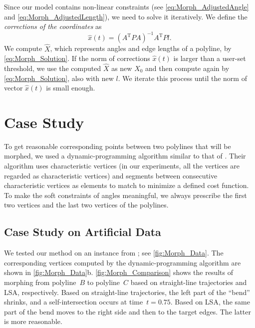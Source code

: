Since our model contains non-linear constraints
(see \eqs\ref{eq:Morph_AdjustedAngle}
and \ref{eq:Morph_AdjustedLength}), 
we need to solve it iteratively.
We define the \emph{corrections of the coordinates} as
\begin{equation}
\label{eq:Morph_CoordinatesCorrections}
\hat{x}(t)= (A^\mathrm{T}PA)^{-1}A^\mathrm{T}Pl.
\end{equation}
We compute $\hat{X}$,
which represents angles and edge lengths of a polyline,
by \eq\ref{eq:Morph_Solution}.
If the norm of corrections $\hat{x}(t)$ 
is larger than a user-set threshold,
we use the computed $\hat{X}$ as new $X_0$ 
and then compute again by \eq\ref{eq:Morph_Solution}, 
also with new $l$.
We iterate this process until 
the norm of vector $\hat{x}(t)$ is small enough.


\section{Case Study}
\label{case-study}

To get reasonable corresponding points between two polylines 
that will be morphed, 
we used a dynamic-programming algorithm 
similar to that of \textcite{Noellenburg2008}. 
Their algorithm uses characteristic vertices 
(in our experiments, 
all the vertices are regarded as characteristic vertices) 
and segments between consecutive characteristic vertices 
as elements to match to minimize a defined cost function. 
To make the soft constraints of angles meaningful, 
we always prescribe the first two vertices 
and the last two vertices of the polylines.

\subsection{Case Study on Artificial Data}
\label{case-study-on-artificial-data}

We tested our method on an instance from \textcite{Bereg2005};
see \fig\ref{fig:Morph_Data}.
The corresponding vertices computed 
by the dynamic-programming algorithm 
are shown in \fig\ref{fig:Morph_Data}b.
\fig\ref{fig:Morph_Comparison} 
shows the results of morphing 
from polyline~$B$ to polyline~$C$ based on
straight-line trajectories and LSA, respectively. 
Based on straight-line trajectories, 
the left part of the ``bend'' shrinks, 
and a self-intersection occurs at time~$t = 0.75$. 
Based on LSA, the same part of the bend moves
to the right side and then to the target edges. 
The latter is more reasonable.


